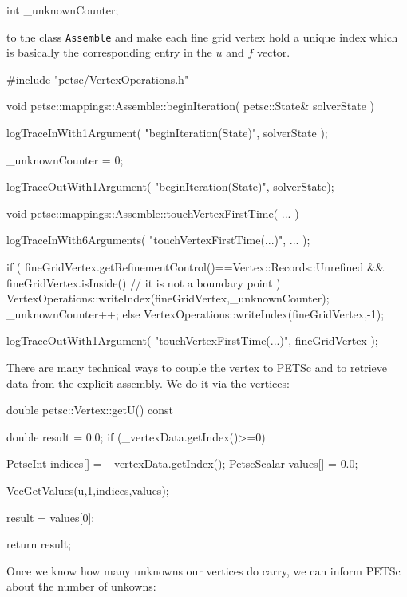 \begin{code}
int  _unknownCounter;
\end{code}

\noindent
to the class \texttt{Assemble} and make each fine grid vertex hold a unique
index which is basically the corresponding entry in the $u$ and $f$ vector.

\begin{code}
#include "petsc/VertexOperations.h"

void petsc::mappings::Assemble::beginIteration(
  petsc::State&  solverState
) {
  logTraceInWith1Argument( "beginIteration(State)", solverState );

  _unknownCounter = 0;

  logTraceOutWith1Argument( "beginIteration(State)", solverState);
}

void petsc::mappings::Assemble::touchVertexFirstTime(
  ...
) {
  logTraceInWith6Arguments( "touchVertexFirstTime(...)", ... );

  if (
    fineGridVertex.getRefinementControl()==Vertex::Records::Unrefined
    &&
    fineGridVertex.isInside() // it is not a boundary point
  ) {
    VertexOperations::writeIndex(fineGridVertex,_unknownCounter);
    _unknownCounter++;
  }
  else {
    VertexOperations::writeIndex(fineGridVertex,-1);
  }

  logTraceOutWith1Argument( "touchVertexFirstTime(...)", fineGridVertex );
}
\end{code}

\noindent
There are many technical ways to couple the vertex to PETSc and to retrieve
data from the explicit assembly.
We do it via the vertices:

\begin{code}
double petsc::Vertex::getU() const {
  double result = 0.0;
  if (_vertexData.getIndex()>=0) {
    PetscInt     indices[] = {_vertexData.getIndex()};
    PetscScalar  values[]  = {0.0};

    VecGetValues(u,1,indices,values);

    result = values[0];
  }
  return result;
}
\end{code}


\noindent
Once we know how many unknowns our vertices do carry, we can inform PETSc about
the number of unkowns:

